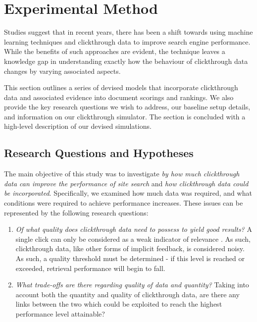 \section{Experimental Method}\label{sec_method}
Studies suggest that in recent years, there has been a shift towards using machine learning techniques and clickthrough data to improve search engine performance. While the benefits of such approaches are evident, the technique leaves a knowledge gap in understanding exactly how the behaviour of clickthrough data changes by varying associated aspects.

This section outlines a series of devised models that incorporate clickthrough data and associated evidence into document scorings and rankings. We also provide the key research questions we wish to address, our baseline setup details, and information on our clickthrough simulator. The section is concluded with a high-level description of our devised simulations.

\subsection{Research Questions and Hypotheses}\label{sec:method:questions}
The main objective of this study was to investigate \emph{by how much clickthrough data can improve the performance of site search} and \emph{how clickthrough data could be incorporated}. Specifically, we examined how much data was required, and what conditions were required to achieve performance increases. These issues can be represented by the following research questions: 

\begin{enumerate}
	
	\item{\emph{Of what quality does clickthrough data need to possess to yield good results?} A single click can only be considered as a weak indicator of relevance \cite{kelly2005implicit_feedback}. As such, clickthrough data, like other forms of implicit feedback, is considered noisy. As such, a quality threshold must be determined - if this level is reached or exceeded, retrieval performance will begin to fall.}
	
	\item{\emph{What trade-offs are there regarding quality of data and quantity?} Taking into account both the quantity and quality of clickthrough data, are there any links between the two which could be exploited to reach the highest performance level attainable?}

\end{enumerate}


